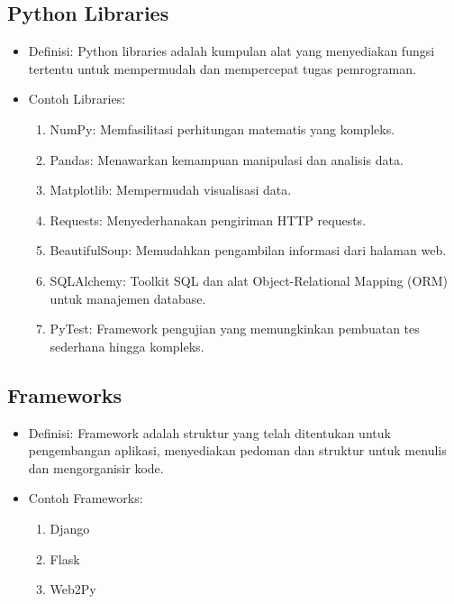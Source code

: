 \documentclass{article}
\begin{document}
\subsection{Python Libraries}
\begin{itemize}
    \item Definisi: Python libraries adalah kumpulan alat yang menyediakan fungsi tertentu untuk mempermudah dan mempercepat tugas pemrograman.
    \item Contoh Libraries:
          \begin{enumerate}
              \item NumPy: Memfasilitasi perhitungan matematis yang kompleks.
              \item Pandas: Menawarkan kemampuan manipulasi dan analisis data.
              \item Matplotlib: Mempermudah visualisasi data.
              \item Requests: Menyederhanakan pengiriman HTTP requests.
              \item BeautifulSoup: Memudahkan pengambilan informasi dari halaman web.
              \item SQLAlchemy: Toolkit SQL dan alat Object-Relational Mapping (ORM) untuk manajemen database.
              \item PyTest: Framework pengujian yang memungkinkan pembuatan tes sederhana hingga kompleks.
          \end{enumerate}
\end{itemize}

\subsection{Frameworks}
\begin{itemize}
    \item Definisi: Framework adalah struktur yang telah ditentukan untuk pengembangan aplikasi, menyediakan pedoman dan struktur untuk menulis dan mengorganisir kode.
    \item Contoh Frameworks:
          \begin{enumerate}
              \item Django
              \item Flask
              \item Web2Py
          \end{enumerate}
\end{itemize}
\end{document}
